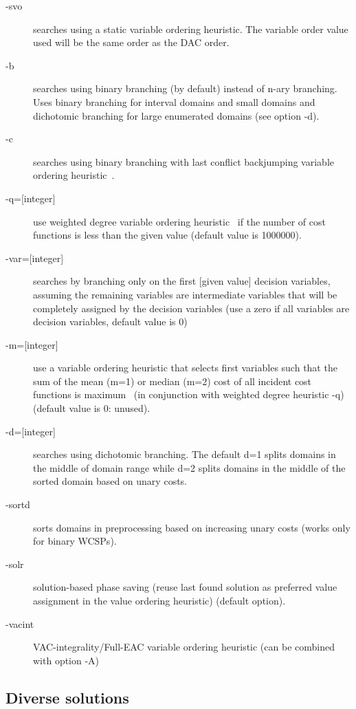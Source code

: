 \documentclass{article}
\begin{document}
\begin{description}
\item[-svo] searches using a static variable ordering heuristic. The
  variable order value used will be the same order as the DAC order.
\item[-b] searches using binary branching (by default) instead of n-ary branching.
  Uses binary branching for interval domains and small domains
  and dichotomic branching for large enumerated domains (see option -d).
\item[-c] searches using binary branching with last conflict
  backjumping variable ordering heuristic~\cite{Lecoutre09}.
\item[{-q=[integer]}] use
  weighted degree variable ordering heuristic~\cite{boussemart2004} if the number of cost
  functions is less than the given value (default value is 1000000).
\item[{-var=[integer]}]
  searches by branching only on the first [given value]
  decision variables, assuming the remaining variables are
  intermediate variables that will be completely assigned by the
  decision variables (use a zero if all variables are decision
  variables, default value is 0)
\item[{-m=[integer]}]
  use a variable ordering heuristic that selects first variables such
  that the sum of the mean (m=1) or median (m=2) cost of all incident
  cost functions is maximum~\cite{Schiex14a} (in conjunction with weighted degree
  heuristic -q) (default value is 0: unused).
\item[{-d=[integer]}]
  searches using dichotomic branching. The default d=1 splits domains
  in the middle of domain range while d=2 splits domains in the middle
  of the sorted domain based on unary costs. 
\item[-sortd] sorts domains in preprocessing based on increasing unary costs (works only for binary WCSPs).
\item[-solr] solution-based phase saving (reuse last found solution as preferred value assignment in the value ordering heuristic) (default option).
\item[-vacint] VAC-integrality/Full-EAC variable ordering heuristic (can be combined with option -A)
\end{description}

\subsection{Diverse solutions}
\end{document}

